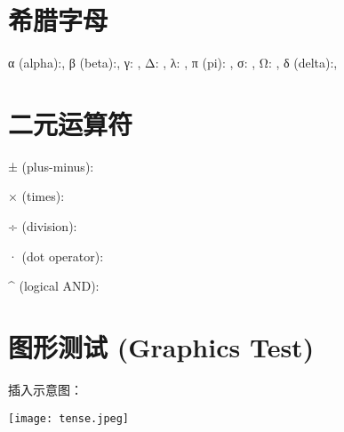 \documentclass[a4paper,12pt]{article}
\begin{document}

    \section*{希腊字母}
    α (alpha):\alpha, \;
    β (beta):\beta, \;
    γ: \gamma, \;
    Δ: \Delta, \;
    λ: \lambda, \;
    π (pi): \pi, \;
    σ: \sigma, \;
    Ω: \Omega, \;
    δ (delta):\delta, \;



    \section*{二元运算符}
    ± (plus-minus):\pm

    × (times):\times

    ÷ (division):\div

    · (dot operator):\dot

    ^ (logical AND):\wedge


    \section*{图形测试 (Graphics Test)}
    插入示意图：

    \texttt{[image: tense.jpeg]}
\end{document}
